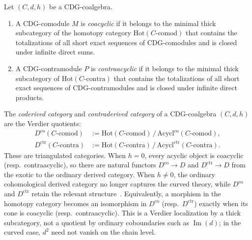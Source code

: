 \begin{definition}
\label{def:coacyclic-contraacyclic}
Let $(C, d, h)$ be a CDG-coalgebra.
\begin{enumerate}[label=\textup{(\roman*)}]
\item A CDG-comodule $M$ is \emph{coacyclic} if it belongs to the
 minimal thick subcategory of the homotopy category
 $\mathrm{Hot}(C\text{-}\mathrm{comod})$ that contains the
 totalizations of all short exact sequences of CDG-comodules
 and is closed under infinite direct sums.
\item A CDG-contramodule $P$ is \emph{contraacyclic} if it belongs
 to the minimal thick subcategory of
 $\mathrm{Hot}(C\text{-}\mathrm{contra})$ that contains the
 totalizations of all short exact sequences of CDG-contramodules
 and is closed under infinite direct products.
\end{enumerate}
\end{definition}

\begin{definition}
\label{def:coderived-contraderived-abstract}
The \emph{coderived category} and \emph{contraderived category}
of a CDG-coalgebra $(C, d, h)$ are the Verdier quotients:
\begin{align}
D^{\mathrm{co}}(C\text{-}\mathrm{comod})
 &:= \mathrm{Hot}(C\text{-}\mathrm{comod})
 \,\big/\, \mathrm{Acycl}^{\mathrm{co}}(C\text{-}\mathrm{comod}),
 \label{eq:coderived-abstract}\\
D^{\mathrm{ctr}}(C\text{-}\mathrm{contra})
 &:= \mathrm{Hot}(C\text{-}\mathrm{contra})
 \,\big/\,
 \mathrm{Acycl}^{\mathrm{ctr}}(C\text{-}\mathrm{contra}).
 \label{eq:contraderived-abstract}
\end{align}
These are triangulated categories. When $h = 0$, every acyclic
object is coacyclic (resp.\ contraacyclic), so there are natural
functors $D^{\mathrm{co}} \to D$ and $D^{\mathrm{ctr}} \to D$
from the exotic to the ordinary derived category. When
$h \neq 0$, the ordinary cohomological derived category no longer
captures the curved theory, while $D^{\mathrm{co}}$ and
$D^{\mathrm{ctr}}$ retain the relevant structure~\cite[\S\S3--4]{Positselski11}.
Equivalently, a morphism in the homotopy category becomes an
isomorphism in $D^{\mathrm{co}}$ \textup{(}resp.\
$D^{\mathrm{ctr}}$\textup{)} exactly when its cone is coacyclic
\textup{(}resp.\ contraacyclic\textup{)}. This is a Verdier
localization by a thick subcategory, not a quotient by ordinary
coboundaries such as $\operatorname{Im}(d)$; in the curved case,
$d^2$ need not vanish on the chain level.
\end{definition}

